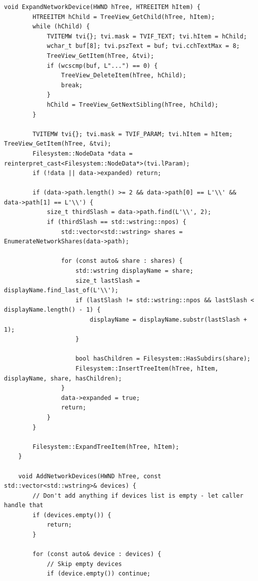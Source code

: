 \begin{lstlisting}[style=CodeListing]
    void ExpandNetworkDevice(HWND hTree, HTREEITEM hItem) {
        HTREEITEM hChild = TreeView_GetChild(hTree, hItem);
        while (hChild) {
            TVITEMW tvi{}; tvi.mask = TVIF_TEXT; tvi.hItem = hChild;
            wchar_t buf[8]; tvi.pszText = buf; tvi.cchTextMax = 8;
            TreeView_GetItem(hTree, &tvi);
            if (wcscmp(buf, L"...") == 0) {
                TreeView_DeleteItem(hTree, hChild);
                break;
            }
            hChild = TreeView_GetNextSibling(hTree, hChild);
        }
        
        TVITEMW tvi{}; tvi.mask = TVIF_PARAM; tvi.hItem = hItem; TreeView_GetItem(hTree, &tvi);
        Filesystem::NodeData *data = reinterpret_cast<Filesystem::NodeData*>(tvi.lParam);
        if (!data || data->expanded) return;
        
        if (data->path.length() >= 2 && data->path[0] == L'\\' && data->path[1] == L'\\') {
            size_t thirdSlash = data->path.find(L'\\', 2);
            if (thirdSlash == std::wstring::npos) {
                std::vector<std::wstring> shares = EnumerateNetworkShares(data->path);
                
                for (const auto& share : shares) {
                    std::wstring displayName = share;
                    size_t lastSlash = displayName.find_last_of(L'\\');
                    if (lastSlash != std::wstring::npos && lastSlash < displayName.length() - 1) {
                        displayName = displayName.substr(lastSlash + 1);
                    }
                    
                    bool hasChildren = Filesystem::HasSubdirs(share);
                    Filesystem::InsertTreeItem(hTree, hItem, displayName, share, hasChildren);
                }
                data->expanded = true;
                return;
            }
        }
        
        Filesystem::ExpandTreeItem(hTree, hItem);
    }
    
    void AddNetworkDevices(HWND hTree, const std::vector<std::wstring>& devices) {
        // Don't add anything if devices list is empty - let caller handle that
        if (devices.empty()) {
            return;
        }
        
        for (const auto& device : devices) {
            // Skip empty devices
            if (device.empty()) continue;
            

\end{lstlisting}
